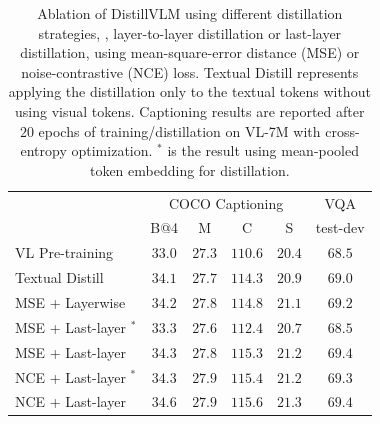 \begin{table}[t!]
    \centering
    \setlength{\tabcolsep}{3.1pt} %
    \renewcommand{\arraystretch}{1.2} %
    \caption[Ablation of DistillV{\small L}M  using different distillation strategies.]{
    Ablation of DistillV{\small L}M  using different distillation strategies, \ie, layer-to-layer distillation or last-layer distillation, using mean-square-error distance (MSE) or noise-contrastive (NCE) loss. Textual Distill represents applying the distillation only to the textual tokens without using visual tokens.
    Captioning results are reported after $20$ epochs of training/distillation on VL-7M with cross-entropy optimization. {\color{red} $^{*}$} is the result using mean-pooled token embedding for distillation.
    }    
    { \small
    \begin{tabular}{l|cccc|c}
   \quad\enspace \multirow{2}{*}{\textbf{Methods}} & \multicolumn{4}{c|}{{ COCO Captioning}} & \multicolumn{1}{c}{{ VQA}}  \\ 
    &  {B@4} & {M} & {C} & {S} & {test-dev} \\
    \hline  \rule{0pt}{1.0\normalbaselineskip}
    VL Pre-training~\cite{li2020oscar} & $33.0$ & $27.3$ & $110.6$ & $20.4$ & $68.5$ \\
    Textual Distill & \cellcolor{gray!10}$34.1$ & $27.7$ & \cellcolor{gray!10}$114.3$ & $20.9$ & \cellcolor{gray!10}$69.0$  \\
    MSE + Layerwise & \cellcolor{gray!10}$34.2$  & $27.8$  & \cellcolor{gray!10}$114.8$ & $21.1$ & \cellcolor{gray!10}$69.2$  \\
    MSE + Last-layer{\color{red} $^{*}$} & \cellcolor{gray!5}$33.3$  & $27.6$ & \cellcolor{gray!5}$112.4$ & $20.7$ & \cellcolor{gray!5}$68.5$ \\
    MSE + Last-layer & \cellcolor{gray!15}$34.3$  & $27.8$ & \cellcolor{gray!15}$115.3$ & $21.2$ & \cellcolor{gray!15}$69.4$ \\
    NCE + Last-layer{\color{red} $^{*}$} & \cellcolor{gray!15}$34.3$ & $27.9$ & \cellcolor{gray!15}$115.4$ & $21.2$  & \cellcolor{gray!12}$69.3$\\
    NCE + Last-layer & \cellcolor{gray!20}$34.6$ & $27.9$ & \cellcolor{gray!25}$115.6$ & $21.3$ & \cellcolor{gray!20}$69.4$\\
    \end{tabular}
    }
    \label{tab:losses}
\end{table}


